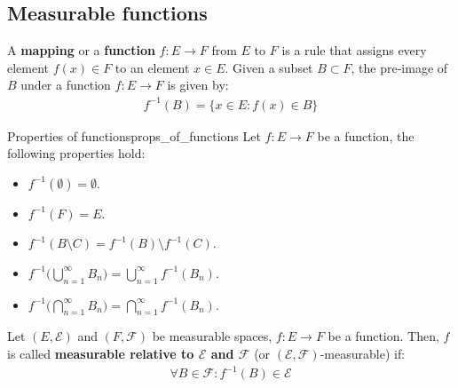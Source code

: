 \subsection{Measurable functions}
\begin{definition}
    A \textbf{mapping} or a \textbf{function} $f:E\to F$ from $E$ to $F$ is a rule that assigns every element $f(x) \in F$ to an element $x\in E$. Given a subset $B\subset F$, the pre-image of $B$ under a function $f:E\to F$ is given by:
    \begin{align*}
        f^{-1}(B) = \Big\{ x \in E : f(x) \in B \Big\}
    \end{align*}
\end{definition}

\begin{proposition}{Properties of functions}{props_of_functions}
    Let $f:E\to F$ be a function, the following properties hold:
    \begin{itemize}
        \item $f^{-1}(\emptyset)=\emptyset$.
        \item $f^{-1}(F)=E$.
        \item $f^{-1}(B\setminus C) = f^{-1}(B)\setminus f^{-1}(C)$.
        \item $f^{-1}\Bigg( \bigcup_{n=1}^\infty B_n \Bigg) = \bigcup_{n=1}^\infty f^{-1}(B_n)$.
        \item $f^{-1}\Bigg( \bigcap_{n=1}^\infty B_n \Bigg) = \bigcap_{n=1}^\infty f^{-1}(B_n)$.
    \end{itemize}
\end{proposition}

\begin{definition}
    Let $(E, \mathcal{E})$ and $(F, \mathcal{F})$ be measurable spaces, $f:E\to F$ be a function. Then, $f$ is called \textbf{measurable relative to $\mathcal{E}$ and $\mathcal{F}$} (or $(\mathcal{E}, \mathcal{F})$-measurable) if:
    \begin{align*}
        \forall B \in \mathcal{F} : f^{-1}(B) \in \mathcal{E}
    \end{align*}
\end{definition}


